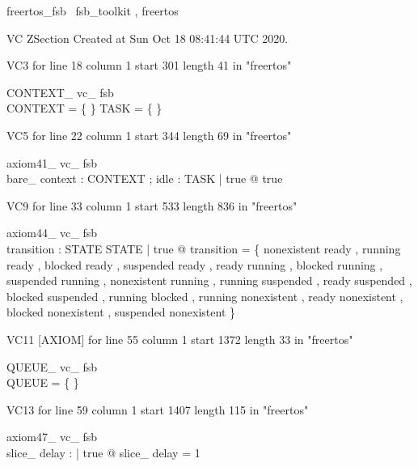 \documentclass{article}
\begin{document}

\begin{zsection}	 \SECTION freertos\_fsb \parents~fsb\_toolkit , freertos
\end{zsection}

VC ZSection Created at Sun Oct 18 08:41:44 UTC 2020.

VC3 for line 18 column 1 start 301 length 41 in "freertos"
\begin{theorem}{ CONTEXT\_ vc\_ fsb}\\
 \lnot CONTEXT = \{ \} \land \lnot TASK = \{ \} \\

\end{theorem}

VC5 for line 22 column 1 start 344 length 69 in "freertos"
\begin{theorem}{ axiom41\_ vc\_ fsb}\\
 \exists bare\_ context : CONTEXT ; idle : TASK | true @ true \\

\end{theorem}

VC9 for line 33 column 1 start 533 length 836 in "freertos"
\begin{theorem}{ axiom44\_ vc\_ fsb}\\
 \exists transition : STATE \rel STATE | true @ transition = \{ nonexistent \mapsto ready , running \mapsto ready , blocked \mapsto ready , suspended \mapsto ready , ready \mapsto running , blocked \mapsto running , suspended \mapsto running , nonexistent \mapsto running , running \mapsto suspended , ready \mapsto suspended , blocked \mapsto suspended , running \mapsto blocked , running \mapsto nonexistent , ready \mapsto nonexistent , blocked \mapsto nonexistent , suspended \mapsto nonexistent \} \\

\end{theorem}

VC11 [AXIOM] for line 55 column 1 start 1372 length 33 in "freertos"
\begin{theorem}{ QUEUE\_ vc\_ fsb}\\
 \lnot QUEUE = \{ \} \\

\end{theorem}

VC13 for line 59 column 1 start 1407 length 115 in "freertos"
\begin{theorem}{ axiom47\_ vc\_ fsb}\\
 \exists slice\_ delay : \nat | true @ slice\_ delay = 1 \\

\end{theorem}
\end{document}
